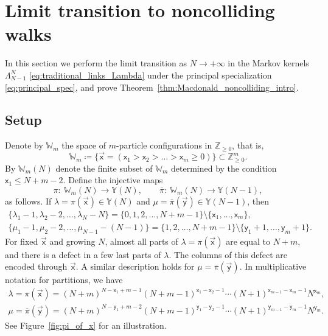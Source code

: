\section{Limit transition to noncolliding walks}\label{sec:limit_transition}

In this section we perform the limit transition as $N\to+\infty$ in the
Markov kernels $\Lambda^{N}_{N-1}$ \eqref{eq:traditional_links_Lambda}
under the principal specialization
\eqref{eq:principal_spec}, and prove
Theorem~\ref{thm:Macdonald_noncolliding_intro}.

\subsection{Setup}\label{sub:limit_transition_setup}

Denote by $\mathbb{W}_m$ the space of $m$-particle configurations
in $\mathbb{Z}_{\ge0}$, that is,
\begin{equation}
	\label{eq:W_m_space}
	\mathbb{W}_m\coloneqq
	\{
		\vec{\mathsf{x}}=(\mathsf{x}_1>\mathsf{x}_2>\dots>\mathsf{x}_m\ge0 )
	\}\subset \mathbb{Z}_{\ge0}^{m}.
\end{equation}
By $\mathbb{W}_m(N)$ denote the finite subset of $\mathbb{W}_m$ determined by
the condition
$\mathsf{x}_1\le N+m-2$. Define the injective maps
\begin{equation}
	\label{eq:pi_maps_1}
	\pi\colon \ \mathbb{W}_m(N)\to \mathbb{Y}(N), \qquad
	\overline\pi\colon \ \mathbb{W}_m(N)\to \mathbb{Y}(N-1),
\end{equation}
as follows. If $\lambda=\pi(\vec{\mathsf{x}})\in \mathbb{Y}(N)$
and $\mu=\overline\pi(\vec {\mathsf{y}})\in \mathbb{Y}(N-1)$, then
\begin{gather}
 \{ \lambda_1-1,\lambda_2-2,\dots,\lambda_N-N \}=
 \{ 0,1,2,\dots,N+m-1 \}\setminus
		\{\mathsf{x}_1,\dots, \mathsf{x}_m \},\nonumber\\
		 \{ \mu_1-1,\mu_2-2,\dots,\mu_{N-1}-(N-1) \}=
		 \{ 1,2,\dots,N+m-1 \}\setminus
		\{\mathsf{y}_1+1,\dots, \mathsf{y}_m+1 \}.\!\!\!\label{eq:pi_maps_2}
	\end{gather}
For fixed $\vec{\mathsf{x}}$ and growing $N$,
almost all parts of $\lambda=\pi(\vec{\mathsf{x}})$
are equal to $N+m$, and there is a defect in a few last parts of
$\lambda$. The columns of this defect are
encoded through
$\vec{\mathsf{x}}$. A similar description holds for
$\mu=\overline\pi(\vec{\mathsf{y}})$.
In multiplicative notation for partitions, we have
\begin{gather}
		\lambda=\pi(\vec{\mathsf{x}})=
		(N+m)^{N-\mathsf{x}_1+m-1}(N+m-1)^{\mathsf{x}_1-\mathsf{x}_2-1}
		\cdots (N+1)^{\mathsf{x}_{m-1}-\mathsf{x}_m-1} N^{\mathsf{x}_m},
\nonumber\\
		\mu=\overline\pi(\vec{\mathsf{y}})=
		(N+m)^{N-\mathsf{y}_1+m-2}(N+m-1)^{\mathsf{y}_1-\mathsf{y}_2-1}
		\cdots (N+1)^{\mathsf{y}_{m-1}-\mathsf{y}_m-1}
		N^{\mathsf{y}_m}.\label{eq:pi_maps_multiplicative_notation}
	\end{gather}
See
Figure~\ref{fig:pi_of_x} for an illustration.

